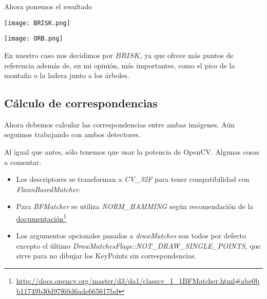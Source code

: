 \documentclass[a4paper, 11pt]{article}
\newcommand\fnurl[2]{%
  \href{#2}{#1}\footnote{\url{#2}}%
}
\theoremstyle{definition}
\begin{document}
    Ahora ponemos el resultado

    \centerline{\texttt{[image: BRISK.png]}}
    \centerline{\texttt{[image: ORB.png]}}

    En nuestro caso nos decidimos por $BRISK$, ya que ofrece más puntos de referencia
    además de, en mi opinión, más importantes, como el pico de la montaña o la ladera junto a los árboles.

    \subsection{Cálculo de correspondencias}

      Ahora debemos calcular las correspondencias entre ambas imágenes. Aún seguimos trabajando con ambos detectores.

      Al igual que antes, sólo tenemos que usar la potencia de OpenCV. Algunas cosas a comentar:

      \begin{itemize}
        \item Los descriptores se transforman a \textit{CV\_32F} para tener compatibilidad con \textit{FlannBasedMatcher}.
        \item Para \textit{BFMatcher} se utiliza \textit{NORM\_HAMMING} según recomendación de la \fnurl{documentación}{http://docs.opencv.org/master/d3/da1/classcv_1_1BFMatcher.html\#abe0bb11749b30d97f60d6ade665617bd}
        \item Los argumentos opcionales pasados a \textit{drawMatches} son todos por defecto excepto el último \textit{DrawMatchesFlags::NOT\_DRAW\_SINGLE\_POINTS}, que sirve para no dibujar los KeyPoints sin correspondencias.
      \end{itemize}
\end{document}
